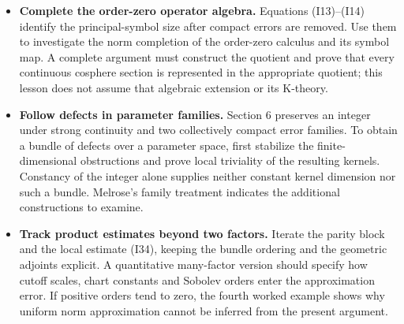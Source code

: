 \documentclass[
  11pt,
]{article}
\providecommand{\tightlist}{%
  \setlength{\itemsep}{0pt}\setlength{\parskip}{0pt}}
\begin{document}
\begin{itemize}
\tightlist
\item
  \textbf{Complete the order-zero operator algebra.} Equations
  (I13)--(I14) identify the principal-symbol size after compact errors
  are removed. Use them to investigate the norm completion of the
  order-zero calculus and its symbol map. A complete argument must
  construct the quotient and prove that every continuous cosphere
  section is represented in the appropriate quotient; this lesson does
  not assume that algebraic extension or its K-theory.
\item
  \textbf{Follow defects in parameter families.} Section 6 preserves an
  integer under strong continuity and two collectively compact error
  families. To obtain a bundle of defects over a parameter space, first
  stabilize the finite-dimensional obstructions and prove local
  triviality of the resulting kernels. Constancy of the integer alone
  supplies neither constant kernel dimension nor such a bundle.
  Melrose's family treatment indicates the additional constructions to
  examine.
\item
  \textbf{Track product estimates beyond two factors.} Iterate the
  parity block and the local estimate (I34), keeping the bundle ordering
  and the geometric adjoints explicit. A quantitative many-factor
  version should specify how cutoff scales, chart constants and Sobolev
  orders enter the approximation error. If positive orders tend to zero,
  the fourth worked example shows why uniform norm approximation cannot
  be inferred from the present argument.
\end{itemize}
\end{document}
